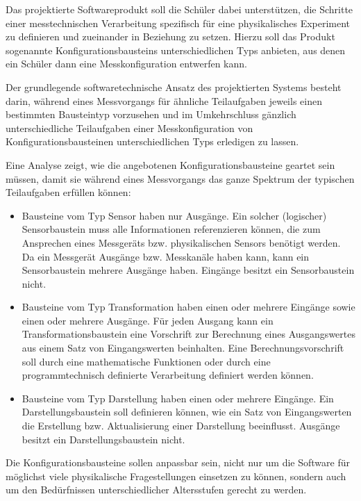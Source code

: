 \documentclass[parskip=full]{scrartcl}
\begin{document}
Das projektierte Softwareprodukt soll die Schüler dabei unterstützen, die Schritte einer messtechnischen Verarbeitung spezifisch für eine physikalisches Experiment zu definieren und zueinander in Beziehung zu setzen. Hierzu soll das Produkt sogenannte \glspl{Konfigurationsbaustein} unterschiedlichen Typs anbieten, aus denen ein Schüler dann eine Messkonfiguration entwerfen kann. 

 Der grundlegende softwaretechnische Ansatz des projektierten Systems besteht darin, während eines Messvorgangs für ähnliche Teilaufgaben jeweils einen bestimmten Bausteintyp vorzusehen und im Umkehrschluss gänzlich unterschiedliche Teilaufgaben einer Messkonfiguration von Konfigurationsbausteinen unterschiedlichen Typs erledigen zu lassen.
 
  Eine Analyse zeigt, wie die angebotenen Konfigurationsbausteine geartet sein müssen, damit sie während eines Messvorgangs das ganze Spektrum der typischen Teilaufgaben erfüllen können:

\begin{itemize}
	
	\item Bausteine vom Typ Sensor haben nur Ausgänge. Ein solcher (logischer) Sensorbaustein muss alle Informationen referenzieren können, die zum Ansprechen eines Messgeräts bzw. physikalischen Sensors benötigt werden. Da ein Messgerät Ausgänge bzw. Messkanäle haben kann, kann ein Sensorbaustein mehrere Ausgänge haben. Eingänge besitzt ein Sensorbaustein nicht. 
	
	\item Bausteine vom Typ Transformation haben einen oder mehrere Eingänge sowie einen oder mehrere Ausgänge. Für jeden Ausgang kann  ein Transformationsbaustein eine Vorschrift zur Berechnung eines Ausgangswertes aus einem Satz von Eingangswerten beinhalten. Eine Berechnungsvorschrift soll durch eine mathematische Funktionen oder durch eine programmtechnisch definierte Verarbeitung definiert werden können.
	
	\item Bausteine vom Typ Darstellung haben einen oder mehrere Eingänge. Ein Darstellungsbaustein soll definieren können, wie ein Satz von Eingangswerten die Erstellung bzw. Aktualisierung einer Darstellung beeinflusst. Ausgänge besitzt ein Darstellungsbaustein nicht. 
	
\end{itemize}

Die Konfigurationsbausteine sollen anpassbar sein, nicht nur um die Software für möglichst viele physikalische Fragestellungen einsetzen zu können, sondern auch um den Bedürfnissen unterschiedlicher Altersstufen gerecht zu werden. 
\end{document}
